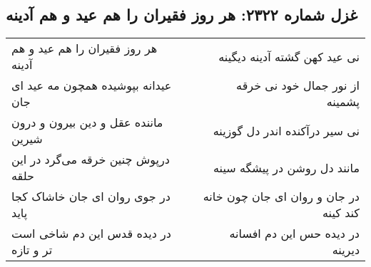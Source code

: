 \begin{center}
\section*{غزل شماره ۲۳۲۲: هر روز فقیران را هم عید و هم آدینه}
\label{sec:2322}
\begin{longtable}{l p{0.5cm} r}
هر روز فقیران را هم عید و هم آدینه
&&
نی عید کهن گشته آدینه دیگینه
\\
عیدانه بپوشیده همچون مه عید ای جان
&&
از نور جمال خود نی خرقه پشمینه
\\
ماننده عقل و دین بیرون و درون شیرین
&&
نی سیر درآکنده اندر دل گوزینه
\\
درپوش چنین خرقه می‌گرد در این حلقه
&&
مانند دل روشن در پیشگه سینه
\\
در جوی روان ای جان خاشاک کجا پاید
&&
در جان و روان ای جان چون خانه کند کینه
\\
در دیده قدس این دم شاخی است تر و تازه
&&
در دیده حس این دم افسانه دیرینه
\\
\end{longtable}
\end{center}
